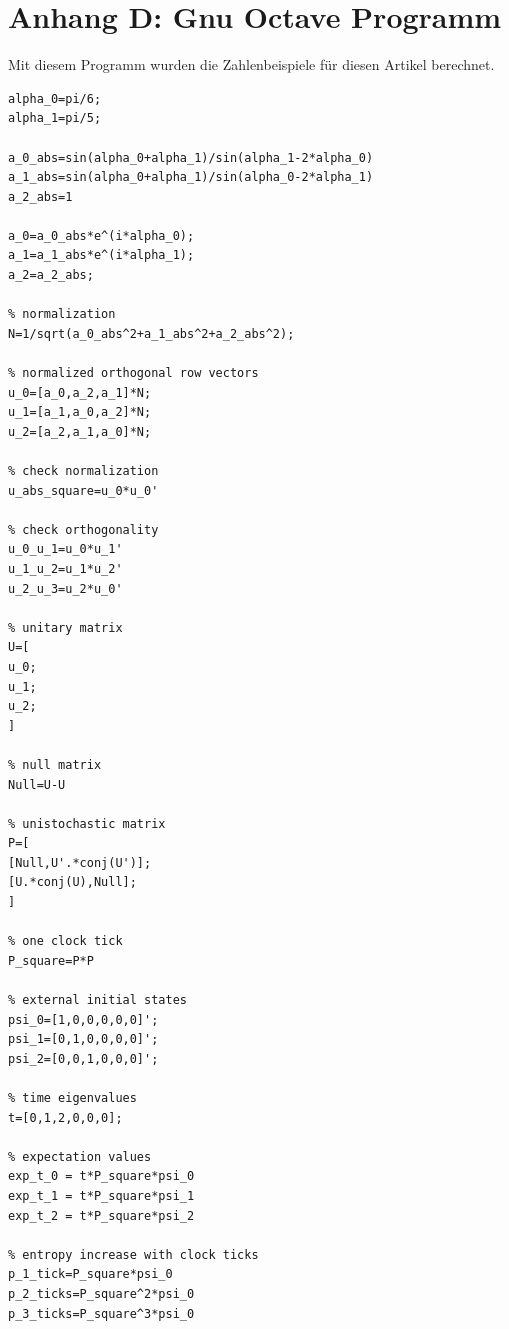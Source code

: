 \documentclass[12pt]{article}
\begin{document}
\section{Anhang D: Gnu Octave Programm}
Mit diesem Programm wurden die Zahlenbeispiele für diesen Artikel berechnet.
\begin{verbatim}
alpha_0=pi/6;
alpha_1=pi/5;

a_0_abs=sin(alpha_0+alpha_1)/sin(alpha_1-2*alpha_0)
a_1_abs=sin(alpha_0+alpha_1)/sin(alpha_0-2*alpha_1)
a_2_abs=1

a_0=a_0_abs*e^(i*alpha_0);
a_1=a_1_abs*e^(i*alpha_1);
a_2=a_2_abs;

% normalization
N=1/sqrt(a_0_abs^2+a_1_abs^2+a_2_abs^2);

% normalized orthogonal row vectors
u_0=[a_0,a_2,a_1]*N;
u_1=[a_1,a_0,a_2]*N;
u_2=[a_2,a_1,a_0]*N;

% check normalization
u_abs_square=u_0*u_0'

% check orthogonality
u_0_u_1=u_0*u_1'
u_1_u_2=u_1*u_2'
u_2_u_3=u_2*u_0'

% unitary matrix
U=[
u_0;
u_1;
u_2;
]

% null matrix
Null=U-U

% unistochastic matrix
P=[
[Null,U'.*conj(U')];
[U.*conj(U),Null];
]

% one clock tick
P_square=P*P

% external initial states
psi_0=[1,0,0,0,0,0]';
psi_1=[0,1,0,0,0,0]';
psi_2=[0,0,1,0,0,0]';

% time eigenvalues
t=[0,1,2,0,0,0];

% expectation values
exp_t_0 = t*P_square*psi_0
exp_t_1 = t*P_square*psi_1
exp_t_2 = t*P_square*psi_2

% entropy increase with clock ticks
p_1_tick=P_square*psi_0
p_2_ticks=P_square^2*psi_0
p_3_ticks=P_square^3*psi_0
\end{verbatim}
\end{document}
